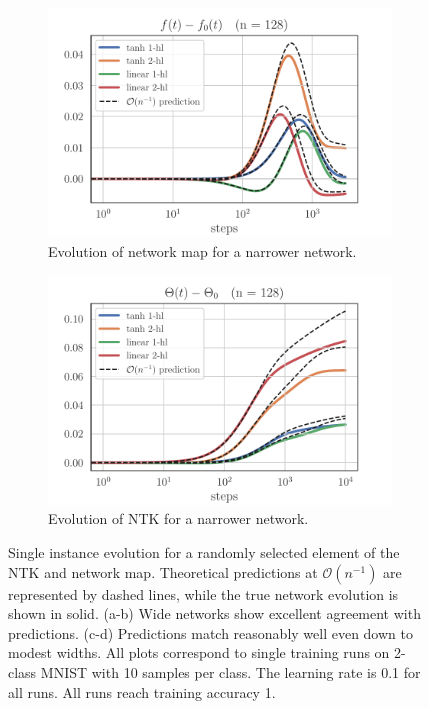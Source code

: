 \documentclass[english]{article}
\begin{document}
\begin{figure}
     \begin{subfigure}[b]{.49\textwidth}
         \centering
         \includegraphics[width=\textwidth]{new_figs/f_evol_narrow}
         \caption{Evolution of network map for a narrower network.}
         \label{fig:f_evol_narrow}
     \end{subfigure}
     \begin{subfigure}[b]{.49\textwidth}
         \centering
         \includegraphics[width=\textwidth]{new_figs/Theta_evol_narrow_diff}
         \caption{Evolution of NTK for a narrower network.}
         \label{fig:Theta_evol_narrow}
     \end{subfigure}
     \caption{Single instance evolution for a randomly selected element of the NTK and network map. Theoretical predictions at $\mathcal{O}(n^{-1})$ are represented by dashed lines, while the true network evolution is shown in solid. (a-b) Wide networks show excellent agreement with predictions. (c-d) Predictions match reasonably well even down to modest widths.
All plots correspond to single training runs on 2-class MNIST with 10 samples per class. The learning rate is 0.1 for all runs. All runs reach training accuracy 1. 
} \label{fig:nlo_time_dep}
 \end{figure}
\end{document}

